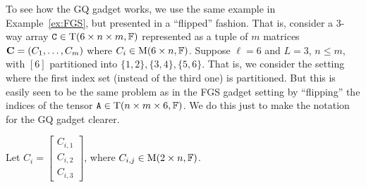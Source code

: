 \begin{example}\label{ex:GQ}
To see how the GQ gadget works, we use the same example in Example~\ref{ex:FGS}, but presented in a ``flipped'' fashion. That is, consider a $3$-way array $\mathtt{C}\in\mathrm{T}(6\times n\times m, \mathbb{F})$ represented as a tuple of $m$ matrices $\mathbf{C}=(C_1, \dots, C_m)$ where $C_i\in\mathrm{M}(6\times n, \mathbb{F})$. Suppose $\ell=6$ and $L=3$, $n\leq m$, with $[6]$ partitioned into $\{1, 2\}, \{3, 4\}, \{5, 6\}$. That is, we consider the setting where the first index set (instead of the third one) is partitioned. But this is easily seen to be the same problem as in the FGS gadget setting by ``flipping'' the indices of the tensor $\mathtt{A}\in \mathrm{T}(n\times m\times 6, \mathbb{F})$. We do this just to make the notation for the GQ gadget clearer.

Let $C_i=\begin{bmatrix}
	C_{i, 1}\\
	C_{i, 2}\\
	C_{i, 3}
\end{bmatrix}$, where $C_{i, j}\in\mathrm{M}(2\times n, \mathbb{F})$. 


\end{example}
